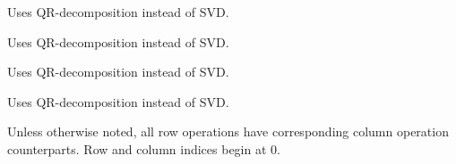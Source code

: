 \begin{description}
\item{}
Uses QR-decomposition instead of SVD.

\item{}
Uses QR-decomposition instead of SVD.

\item{}
Uses QR-decomposition instead of SVD.

\item{}
Uses QR-decomposition instead of SVD.

\end{description}

Unless otherwise noted, all row operations have corresponding column
operation counterparts. Row and column indices begin at 0.


